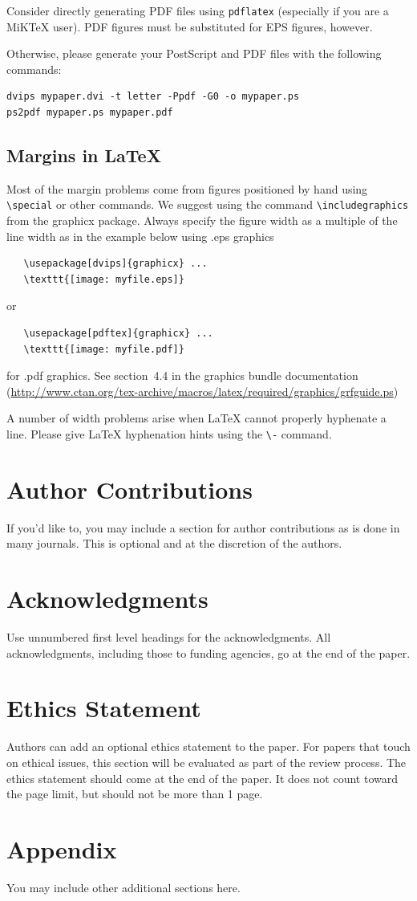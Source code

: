\documentclass{article} %
\begin{document}
Consider directly generating PDF files using \verb+pdflatex+
(especially if you are a MiKTeX user).
PDF figures must be substituted for EPS figures, however.

Otherwise, please generate your PostScript and PDF files with the following commands:
\begin{verbatim}
dvips mypaper.dvi -t letter -Ppdf -G0 -o mypaper.ps
ps2pdf mypaper.ps mypaper.pdf
\end{verbatim}

\subsection{Margins in LaTeX}

Most of the margin problems come from figures positioned by hand using
\verb+\special+ or other commands. We suggest using the command
\verb+\includegraphics+
from the graphicx package. Always specify the figure width as a multiple of
the line width as in the example below using .eps graphics
\begin{verbatim}
   \usepackage[dvips]{graphicx} ...
   \texttt{[image: myfile.eps]}
\end{verbatim}
or %
\begin{verbatim}
   \usepackage[pdftex]{graphicx} ...
   \texttt{[image: myfile.pdf]}
\end{verbatim}
for .pdf graphics.
See section~4.4 in the graphics bundle documentation (\url{http://www.ctan.org/tex-archive/macros/latex/required/graphics/grfguide.ps})

A number of width problems arise when LaTeX cannot properly hyphenate a
line. Please give LaTeX hyphenation hints using the \verb+\-+ command.

\section*{Author Contributions}
If you'd like to, you may include  a section for author contributions as is done
in many journals. This is optional and at the discretion of the authors.

\section*{Acknowledgments}
Use unnumbered first level headings for the acknowledgments. All
acknowledgments, including those to funding agencies, go at the end of the paper.

\section*{Ethics Statement}
Authors can add an optional ethics statement to the paper. 
For papers that touch on ethical issues, this section will be evaluated as part of the review process. The ethics statement should come at the end of the paper. It does not count toward the page limit, but should not be more than 1 page. 






\appendix
\section{Appendix}
You may include other additional sections here.
\end{document}
